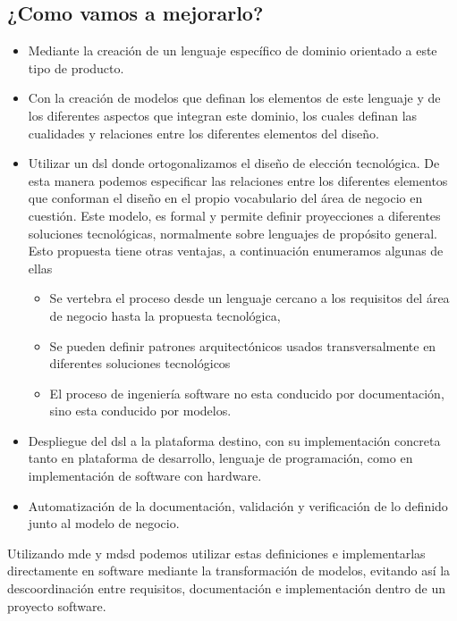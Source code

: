 \subsection{¿Como vamos a mejorarlo?}

\begin{itemize}

\item Mediante la creación de un lenguaje específico de dominio orientado a este tipo de producto.

\item Con la creación de modelos que definan los elementos de este lenguaje y de los diferentes aspectos que integran este dominio, los cuales definan las cualidades y relaciones entre los diferentes elementos del diseño.
 
\item Utilizar un \gls{dsl} donde ortogonalizamos el diseño de elección tecnológica. De esta manera podemos especificar las relaciones entre los diferentes elementos que conforman el diseño en el propio vocabulario del área de negocio en cuestión. Este modelo, es formal y permite definir proyecciones a diferentes soluciones tecnológicas, normalmente sobre lenguajes de propósito general. Esto propuesta tiene otras ventajas, a continuación enumeramos algunas de ellas

\begin{itemize}
    \item Se vertebra el proceso desde un lenguaje cercano a los requisitos del área de negocio hasta la propuesta tecnológica, \item Se pueden definir patrones arquitectónicos usados transversalmente en diferentes soluciones tecnológicos
    \item El proceso de ingeniería software no esta conducido por documentación, sino esta conducido por modelos. 
\end{itemize}

\item Despliegue del \gls{dsl} a la plataforma destino, con su implementación concreta tanto en plataforma de desarrollo, lenguaje de programación, como en implementación de software con hardware.

\item Automatización de la documentación, validación y verificación de lo definido junto al modelo de negocio.

\end{itemize}

Utilizando \gls{mde} y \gls{mdsd} podemos utilizar estas definiciones e implementarlas directamente en software mediante la transformación de modelos, evitando así la descoordinación entre requisitos, documentación e implementación dentro de un proyecto software.

